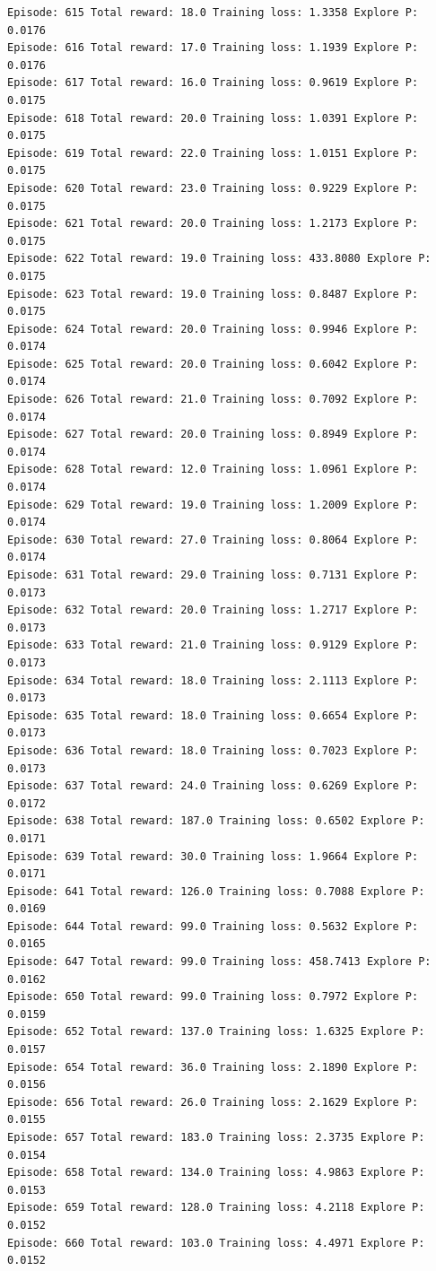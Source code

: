 \documentclass[11pt]{article}
\begin{document}
\begin{Verbatim}[commandchars=\\\{\}]
Episode: 615 Total reward: 18.0 Training loss: 1.3358 Explore P: 0.0176
Episode: 616 Total reward: 17.0 Training loss: 1.1939 Explore P: 0.0176
Episode: 617 Total reward: 16.0 Training loss: 0.9619 Explore P: 0.0175
Episode: 618 Total reward: 20.0 Training loss: 1.0391 Explore P: 0.0175
Episode: 619 Total reward: 22.0 Training loss: 1.0151 Explore P: 0.0175
Episode: 620 Total reward: 23.0 Training loss: 0.9229 Explore P: 0.0175
Episode: 621 Total reward: 20.0 Training loss: 1.2173 Explore P: 0.0175
Episode: 622 Total reward: 19.0 Training loss: 433.8080 Explore P: 0.0175
Episode: 623 Total reward: 19.0 Training loss: 0.8487 Explore P: 0.0175
Episode: 624 Total reward: 20.0 Training loss: 0.9946 Explore P: 0.0174
Episode: 625 Total reward: 20.0 Training loss: 0.6042 Explore P: 0.0174
Episode: 626 Total reward: 21.0 Training loss: 0.7092 Explore P: 0.0174
Episode: 627 Total reward: 20.0 Training loss: 0.8949 Explore P: 0.0174
Episode: 628 Total reward: 12.0 Training loss: 1.0961 Explore P: 0.0174
Episode: 629 Total reward: 19.0 Training loss: 1.2009 Explore P: 0.0174
Episode: 630 Total reward: 27.0 Training loss: 0.8064 Explore P: 0.0174
Episode: 631 Total reward: 29.0 Training loss: 0.7131 Explore P: 0.0173
Episode: 632 Total reward: 20.0 Training loss: 1.2717 Explore P: 0.0173
Episode: 633 Total reward: 21.0 Training loss: 0.9129 Explore P: 0.0173
Episode: 634 Total reward: 18.0 Training loss: 2.1113 Explore P: 0.0173
Episode: 635 Total reward: 18.0 Training loss: 0.6654 Explore P: 0.0173
Episode: 636 Total reward: 18.0 Training loss: 0.7023 Explore P: 0.0173
Episode: 637 Total reward: 24.0 Training loss: 0.6269 Explore P: 0.0172
Episode: 638 Total reward: 187.0 Training loss: 0.6502 Explore P: 0.0171
Episode: 639 Total reward: 30.0 Training loss: 1.9664 Explore P: 0.0171
Episode: 641 Total reward: 126.0 Training loss: 0.7088 Explore P: 0.0169
Episode: 644 Total reward: 99.0 Training loss: 0.5632 Explore P: 0.0165
Episode: 647 Total reward: 99.0 Training loss: 458.7413 Explore P: 0.0162
Episode: 650 Total reward: 99.0 Training loss: 0.7972 Explore P: 0.0159
Episode: 652 Total reward: 137.0 Training loss: 1.6325 Explore P: 0.0157
Episode: 654 Total reward: 36.0 Training loss: 2.1890 Explore P: 0.0156
Episode: 656 Total reward: 26.0 Training loss: 2.1629 Explore P: 0.0155
Episode: 657 Total reward: 183.0 Training loss: 2.3735 Explore P: 0.0154
Episode: 658 Total reward: 134.0 Training loss: 4.9863 Explore P: 0.0153
Episode: 659 Total reward: 128.0 Training loss: 4.2118 Explore P: 0.0152
Episode: 660 Total reward: 103.0 Training loss: 4.4971 Explore P: 0.0152

\end{Verbatim}
\end{document}
